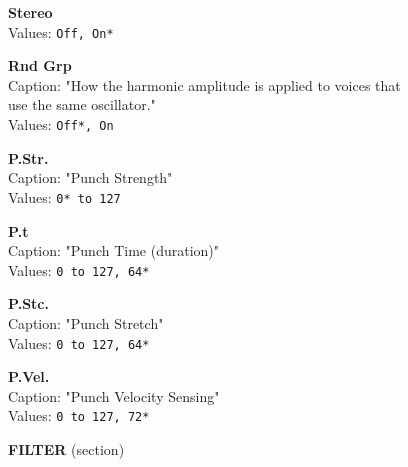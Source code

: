 \documentclass[
 11pt,
 twoside,
 a4paper,
 headinclude,
 footinclude,
 final                                 %
]{article}
\begin{document}
\begin{enumber}
\begin{enumber}
\begin{enumber}
\begin{enumber}
            \item \textbf{Stereo} \\
               Values: \texttt{Off, On*}
            \item \textbf{Rnd Grp} \\
               Caption: "How the harmonic amplitude is applied to voices that \\
                  use the same oscillator." \\
               Values: \texttt{Off*, On}
            \item \textbf{P.Str.} \\
               Caption: "Punch Strength" \\
               Values: \texttt{0* to 127}
            \item \textbf{P.t} \\
               Caption: "Punch Time (duration)" \\
               Values: \texttt{0 to 127, 64*}
            \item \textbf{P.Stc.} \\
               Caption: "Punch Stretch" \\
               Values: \texttt{0 to 127, 64*}
            \item \textbf{P.Vel.} \\
               Caption: "Punch Velocity Sensing" \\
               Values: \texttt{0 to 127, 72*}
         \end{enumber}

         \item \textbf{FILTER} (section)
         \begin{enumber}



\end{enumber}
\end{enumber}
\end{enumber}
\end{enumber}
\end{document}
